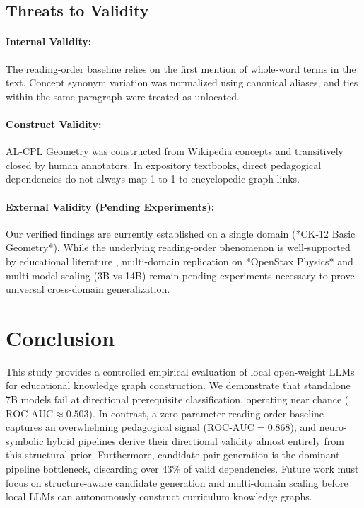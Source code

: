 \documentclass[11pt,a4paper]{article}
\begin{document}
\subsection{Threats to Validity}
\paragraph{Internal Validity:}
The reading-order baseline relies on the first mention of whole-word terms in the text. Concept synonym variation was normalized using canonical aliases, and ties within the same paragraph were treated as unlocated.

\paragraph{Construct Validity:}
AL-CPL Geometry was constructed from Wikipedia concepts and transitively closed by human annotators. In expository textbooks, direct pedagogical dependencies do not always map 1-to-1 to encyclopedic graph links.

\paragraph{External Validity (Pending Experiments):}
Our verified findings are currently established on a single domain (*CK-12 Basic Geometry*). While the underlying reading-order phenomenon is well-supported by educational literature \cite{alzetta2020prereq}, multi-domain replication on *OpenStax Physics* and multi-model scaling (3B vs 14B) remain pending experiments necessary to prove universal cross-domain generalization.

\section{Conclusion}

This study provides a controlled empirical evaluation of local open-weight LLMs for educational knowledge graph construction. We demonstrate that standalone 7B models fail at directional prerequisite classification, operating near chance ($\text{ROC-AUC} \approx 0.503$). In contrast, a zero-parameter reading-order baseline captures an overwhelming pedagogical signal ($\text{ROC-AUC} = 0.868$), and neuro-symbolic hybrid pipelines derive their directional validity almost entirely from this structural prior. Furthermore, candidate-pair generation is the dominant pipeline bottleneck, discarding over $43\%$ of valid dependencies. Future work must focus on structure-aware candidate generation and multi-domain scaling before local LLMs can autonomously construct curriculum knowledge graphs.
\end{document}
